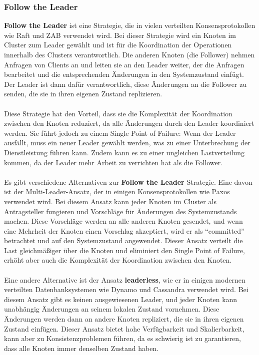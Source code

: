 \subsubsection{Follow the Leader}
\textbf{Follow the Leader} ist eine Strategie, die in vielen verteilten Konsensprotokollen wie Raft und ZAB verwendet wird. Bei dieser Strategie wird ein Knoten im Cluster zum Leader gewählt und ist für die Koordination der Operationen innerhalb des Clusters verantwortlich. Die anderen Knoten (die Follower) nehmen Anfragen von Clients an und leiten sie an den Leader weiter, der die Anfragen bearbeitet und die entsprechenden Änderungen in den Systemzustand einfügt. Der Leader ist dann dafür verantwortlich, diese Änderungen an die Follower zu senden, die sie in ihren eigenen Zustand replizieren.
\\\\
Diese Strategie hat den Vorteil, dass sie die Komplexität der Koordination zwischen den Knoten reduziert, da alle Änderungen durch den Leader koordiniert werden. Sie führt jedoch zu einem Single Point of Failure: Wenn der Leader ausfällt, muss ein neuer Leader gewählt werden, was zu einer Unterbrechung der Dienstleistung führen kann. Zudem kann es zu einer ungleichen Lastverteilung kommen, da der Leader mehr Arbeit zu verrichten hat als die Follower.
\\\\
Es gibt verschiedene Alternativen zur \textbf{Follow the Leader}-Strategie. Eine davon ist der Multi-Leader-Ansatz, der in einigen Konsensprotokollen wie Paxos verwendet wird. Bei diesem Ansatz kann jeder Knoten im Cluster als Antragsteller fungieren und Vorschläge für Änderungen des Systemzustands machen. Diese Vorschläge werden an alle anderen Knoten gesendet, und wenn eine Mehrheit der Knoten einen Vorschlag akzeptiert, wird er als \enquote{committed} betrachtet und auf den Systemzustand angewendet. Dieser Ansatz verteilt die Last gleichmäßiger über die Knoten und eliminiert den Single Point of Failure, erhöht aber auch die Komplexität der Koordination zwischen den Knoten.
\\\\
Eine andere Alternative ist der Ansatz \textbf{leaderless}, wie er in einigen modernen verteilten Datenbanksystemen wie Dynamo und Cassandra verwendet wird. Bei diesem Ansatz gibt es keinen ausgewiesenen Leader, und jeder Knoten kann unabhängig Änderungen an seinem lokalen Zustand vornehmen. Diese Änderungen werden dann an andere Knoten repliziert, die sie in ihren eigenen Zustand einfügen. Dieser Ansatz bietet hohe Verfügbarkeit und Skalierbarkeit, kann aber zu Konsistenzproblemen führen, da es schwierig ist zu garantieren, dass alle Knoten immer denselben Zustand haben.


